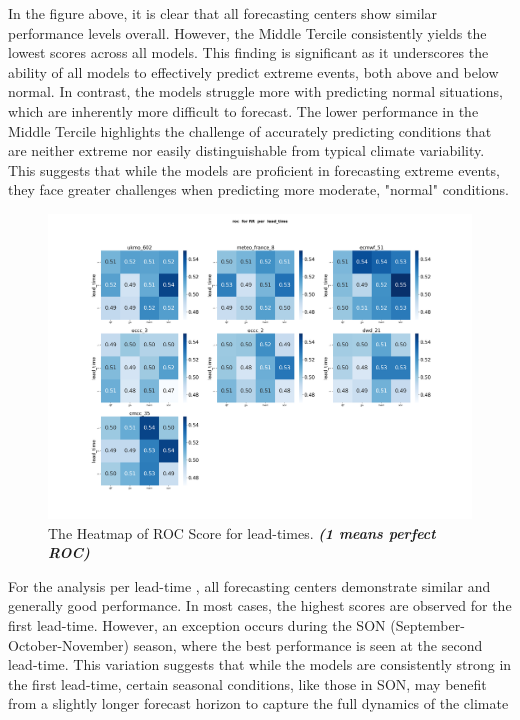 In the figure above, it is clear that all forecasting centers show similar performance levels overall. However, the Middle Tercile consistently yields the lowest scores across all models. This finding is significant as it underscores the ability of all models to effectively predict extreme events, both above and below normal. In contrast, the models struggle more with predicting normal situations, which are inherently more difficult to forecast. The lower performance in the Middle Tercile highlights the challenge of accurately predicting conditions that are neither extreme nor easily distinguishable from typical climate variability. This suggests that while the models are proficient in forecasting extreme events, they face greater challenges when predicting more moderate, "normal" conditions.
\begin{figure}[H]
    \centering
    \includegraphics[scale=0.25]{plots/prob/roc/roc_RR_lead_time.png}
    \caption{The Heatmap of ROC Score for lead-times. \textbf{\textit{(1 means perfect ROC)}}}
\end{figure}

For the analysis per lead-time , all forecasting centers demonstrate similar and generally good performance. In most cases, the highest scores are observed for the first lead-time. However, an exception occurs during the SON (September-October-November) season, where the best performance is seen at the second lead-time. This variation suggests that while the models are consistently strong in the first lead-time, certain seasonal conditions, like those in SON, may benefit from a slightly longer forecast horizon to capture the full dynamics of the climate

